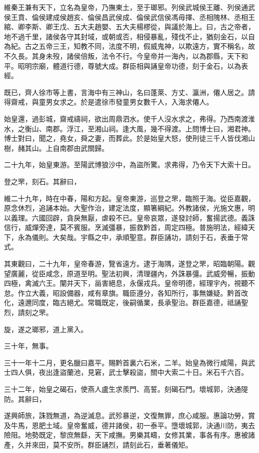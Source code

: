 維秦王兼有天下，立名為皇帝，乃撫東土，至于瑯邪。列侯武城侯王離、列侯通武侯王賁、倫侯建成侯趙亥、倫侯昌武侯成、倫侯武信侯馮毋擇、丞相隗林、丞相王綰、卿李斯、卿王戊、五大夫趙嬰、五大夫楊樛從，與議於海上。曰，古之帝者，地不過千里，諸侯各守其封域，或朝或否，相侵暴亂，殘伐不止，猶刻金石，以自為紀。古之五帝三王，知教不同，法度不明，假威鬼神，以欺遠方，實不稱名，故不久長。其身未歿，諸侯倍叛，法令不行。今皇帝并一海內，以為郡縣，天下和平。昭明宗廟，體道行德，尊號大成。群臣相與誦皇帝功德，刻于金石，以為表經。

既已，齊人徐市等上書，言海中有三神山，名曰蓬萊、方丈、瀛洲，僊人居之。請得齋戒，與童男女求之。於是遣徐市發童男女數千人，入海求僊人。

始皇還，過彭城，齋戒禱祠，欲出周鼎泗水。使千人沒水求之，弗得。乃西南渡淮水，之衡山、南郡。浮江，至湘山祠。逢大風，幾不得渡。上問博士曰，湘君神。博士對曰，聞之，堯女，舜之妻，而葬此。於是始皇大怒，使刑徒三千人皆伐湘山樹，赭其山。上自南郡由武關歸。

二十九年，始皇東游。至陽武博狼沙中，為盜所驚。求弗得，乃令天下大索十日。

登之罘，刻石。其辭曰，

維二十九年，時在中春，陽和方起。皇帝東游，巡登之罘，臨照于海。從臣嘉觀，原念休烈，追誦本始。大聖作治，建定法度，顯箸綱紀。外教諸侯，光施文惠，明以義理。六國回辟，貪戾無厭，虐殺不已。皇帝哀眾，遂發討師，奮揚武德。義誅信行，威燀旁達，莫不賓服。烹滅彊暴，振救黔首，周定四極。普施明法，經緯天下，永為儀則。大矣哉。宇縣之中，承順聖意。群臣誦功，請刻于石，表垂于常式。

其東觀曰，二十九年，皇帝春游，覽省遠方。逮于海隅，遂登之罘，昭臨朝陽。觀望廣麗，從臣咸念，原道至明。聖法初興，清理疆內，外誅暴彊。武威旁暢，振動四極，禽滅六王。闡并天下，甾害絕息，永偃戎兵。皇帝明德，經理宇內，視聽不怠。作立大義，昭設備器，咸有章旗。職臣遵分，各知所行，事無嫌疑。黔首改化，遠邇同度，臨古絕尤。常職既定，後嗣循業，長承聖治。群臣嘉德，祗誦聖烈，請刻之罘。

旋，遂之瑯邪，道上黨入。

三十年，無事。

三十一年十二月，更名臘曰嘉平。賜黔首裏六石米，二羊。始皇為微行咸陽，與武士四人俱，夜出逢盜蘭池，見窘，武士擊殺盜，關中大索二十日。米石千六百。

三十二年，始皇之碣石，使燕人盧生求羨門、高誓。刻碣石門。壞城郭，決通隄防。其辭曰，

遂興師旅，誅戮無道，為逆滅息。武殄暴逆，文復無罪，庶心咸服。惠論功勞，賞及牛馬，恩肥土域。皇帝奮威，德并諸侯，初一泰平。墮壞城郭，決通川防，夷去險阻。地勢既定，黎庶無繇，天下咸撫。男樂其疇，女修其業，事各有序。惠被諸產，久并來田，莫不安所。群臣誦烈，請刻此石，垂著儀矩。

